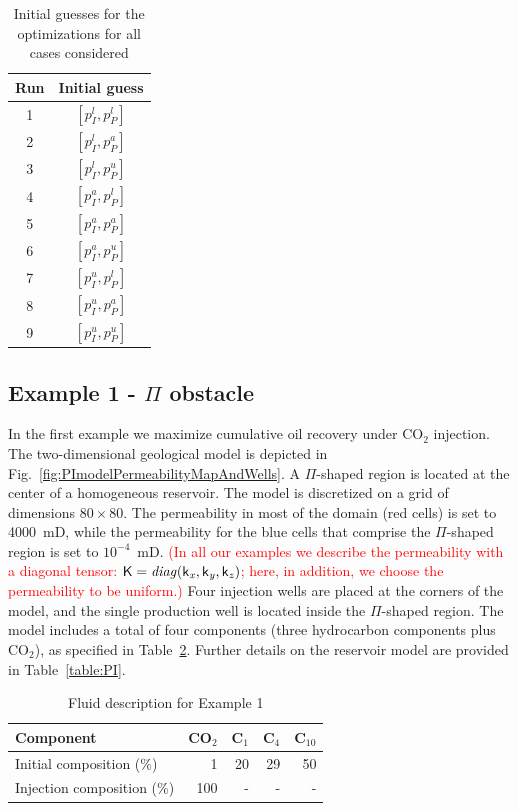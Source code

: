 \documentclass[twocolumn,numbook]{svjour3}          %
\newcommand{\red}[1]{\textcolor{red}{#1}}
\begin{document}
\begin{table}
\centering
\caption{Initial guesses for the optimizations for all
         cases considered}
\begin{tabular}{|c|c|}
\hline
Run & Initial guess    \\
\hline
1 & $[p_I^l, p_P^l]$ \\
2 & $[p_I^l, p_P^a]$ \\
3 & $[p_I^l, p_P^u]$ \\
4 & $[p_I^a, p_P^l]$ \\
5 & $[p_I^a, p_P^a]$ \\
6 & $[p_I^a, p_P^u]$ \\
7 & $[p_I^u, p_P^l]$ \\
8 & $[p_I^u, p_P^a]$ \\
9 & $[p_I^u, p_P^u]$ \\
\hline
\end{tabular}
  \label{table:InitialGuesses}
\end{table}





\subsection{Example 1 - $\Pi$ obstacle}

In the first example we maximize cumulative oil recovery under CO$_2$ injection. The two-dimensional geological model is depicted in Fig.~\ref{fig:PImodelPermeabilityMapAndWells}. A $\Pi$-shaped region is located at the center of a homogeneous reservoir. The model is discretized on a grid of dimensions $80\times80$. The permeability in most of the domain (red cells) is set to 4000~mD, while the permeability for the blue cells that comprise the $\Pi$-shaped region is set to $10^{-4}$~mD. \red{(In all our examples we describe the permeability with a diagonal tensor: $\mathsf{K} = \it{diag}(\mathsf{k}_x, \mathsf{k}_y, \mathsf{k}_z)$; here, in addition, we choose the permeability to be uniform.)}
 Four injection wells are placed at the corners of the model, and the single production well is located inside the $\Pi$-shaped region. The model includes a total of four components (three hydrocarbon  components plus CO$_2$), as specified in Table~\ref{table:fluidForPImodel}. Further details on the reservoir model are provided in Table~\ref{table:PI}.

%
\begin{table}
\centering
\caption{Fluid description for Example 1}
\begin{tabular}{|l|r|r|r|r|}
\hline
Component            & CO$_2$ & C$_1$ & C$_4$ & C$_{10}$    \\
\hline
Initial composition (\%)  & 1    & 20  & 29    & 50 \\
Injection composition (\%)& 100   & - & - & - \\
\hline
\end{tabular}
\label{table:fluidForPImodel}
\end{table}
%
\end{document}
